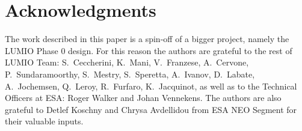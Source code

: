 \documentclass{iac} %
\begin{document}

\maketitle



\section*{Acknowledgments}
The work described in this paper is a spin-off of a bigger project, namely the LUMIO Phase $0$ design. For this reason the authors are grateful to the rest of LUMIO Team: S.\ Ceccherini, K.\ Mani, V.\ Franzese, A.\ Cervone, P.\ Sundaramoorthy, S.\ Mestry, S.\ Speretta, A.\ Ivanov, D.\ Labate, A.\ Jochemsen, Q.\ Leroy, R.\ Furfaro, K.\ Jacquinot, as well as to the Technical Officers at ESA: Roger Walker and Johan Vennekens. The authors are also grateful to Detlef Koschny and Chrysa Avdellidou from ESA NEO Segment for their valuable inputs.

\printbibliography
\end{document}

